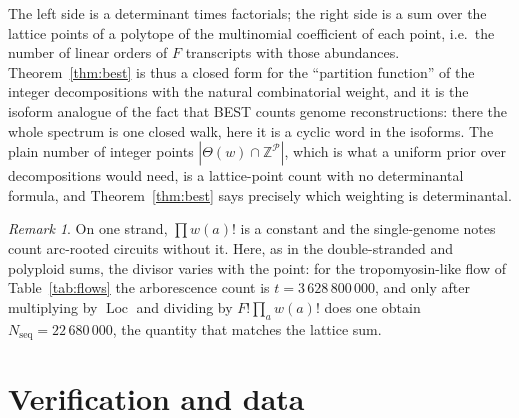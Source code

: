 \documentclass[11pt]{article}
\theoremstyle{plain}
\theoremstyle{definition}
\theoremstyle{remark}
\newtheorem{remark}[theorem]{Remark}
\newcommand{\Z}{\mathbb{Z}}
\newcommand{\Loc}{\operatorname{Loc}}
\newcommand{\Nseq}{N_{\mathrm{seq}}}
\newcommand{\Th}{\Theta}
\begin{document}
The left side is a determinant times factorials; the right side is a sum over the lattice
points of a polytope of the multinomial coefficient of each point, i.e.\ the number of
linear orders of $F$ transcripts with those abundances. Theorem~\ref{thm:best} is thus a
closed form for the ``partition function'' of the integer decompositions with the natural
combinatorial weight, and it is the isoform analogue of the fact that BEST counts genome
reconstructions: there the whole spectrum is one closed walk, here it is a cyclic word in
the isoforms. The plain number of integer points $|\Th(w)\cap\Z^{\mathcal P}|$, which is
what a uniform prior over decompositions would need, is a lattice-point count with no
determinantal formula, and Theorem~\ref{thm:best} says precisely which weighting is
determinantal.

\begin{remark}
On one strand, $\prod w(a)!$ is a constant and the single-genome notes count arc-rooted
circuits without it. Here, as in the double-stranded and polyploid sums, the divisor varies
with the point: for the tropomyosin-like flow of Table~\ref{tab:flows} the arborescence count
is $t=3\,628\,800\,000$, and only after multiplying by $\Loc$ and dividing by
$F!\prod_aw(a)!$ does one obtain $\Nseq=22\,680\,000$, the quantity that matches the lattice
sum.
\end{remark}

\section{Verification and data}\label{sec:data}
\end{document}
